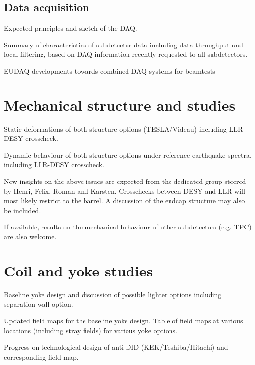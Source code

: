 \subsection{Data acquisition}

Expected principles and sketch of the DAQ.

Summary of characteristics of subdetector data including data throughput and local filtering, 
based on DAQ information recently requested to all subdetectors.

EUDAQ developments towards combined DAQ systems for beamtests

\vspace{2cm}

\section{Mechanical structure and studies}
\label{ild:sec:mechanical_structures}

Static deformations of both structure options (TESLA/Videau) including LLR-DESY crosscheck.

Dynamic behaviour of both structure options under reference earthquake spectra, including LLR-DESY crosscheck.

New insights on the above issues are expected from the dedicated group steered by Henri, Felix, Roman and Karsten. Crosschecks between DESY and LLR will most likely restrict to the barrel. A discussion of the endcap structure may also be included. 

If available, results on the mechanical behaviour of other subdetectors (e.g. TPC) are also welcome.

\vspace{2cm}

\section{Coil and yoke studies}

Baseline yoke design and discussion of possible lighter options including separation wall option.

Updated field maps for the baseline yoke design. Table of field maps at various locations (including stray fields) for various yoke options.

Progress on technological design of anti-DID (KEK/Toshiba/Hitachi) and corresponding field map.

